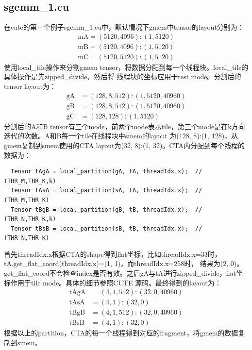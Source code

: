 \documentclass[a4paper,12pt]{ctexart}
\numberwithin{equation}{section}
\begin{document}
\subsection{sgemm\_1.cu}
在cute的第一个例子sgemm\_1.cu中，默认情况下gmem中tensor的layout分别为：
\begin{equation}
  \begin{aligned}
    \mathrm{mA} = (5120,4096):(1,5120) \\
    \mathrm{mB} = (5120,4096):(1,5120) \\
    \mathrm{mC} = (5120,5120):(1,5120)
  \end{aligned}
\end{equation}
使用local\_tile操作来分割gmem tensor，将数据分配到每一个线程块。local\_tile的具体操作是先zipped\_divide，然后将
线程块的坐标应用于rest mode。分割后的tensor layout为：
\begin{equation}
  \begin{aligned}
    \mathrm{gA} & = (128,8,512):(1,5120,40960) \\
    \mathrm{gB} & = (128,8,512):(1,5120,40960) \\
    \mathrm{gC} & = (128,128):(1,5120)
  \end{aligned}
\end{equation}
分割后的A和B tensor有三个mode，前两个mode表示tile，第三个mode是在k方向迭代的次数。A和B每一个tile在线程块中smem的layout
为(128, 8):(1, 128)，从gmem复制到smem使用的CTA layout为(32, 8):(1, 32)。CTA内分配到每个线程的数据为：
\begin{verbatim}
  Tensor tAgA = local_partition(gA, tA, threadIdx.x);  // (THR_M,THR_K,k)
  Tensor tAsA = local_partition(sA, tA, threadIdx.x);  // (THR_M,THR_K)
  Tensor tBgB = local_partition(gB, tB, threadIdx.x);  // (THR_N,THR_K,k)
  Tensor tBsB = local_partition(sB, tB, threadIdx.x);  // (THR_N,THR_K)
\end{verbatim}
首先threadIdx.x根据CTA的shape得到flat坐标，比如threadIdx.x=33时，tA.get_flat_coord(threadIdx.x)=(1, 1)，而threadIdx.x=258时，
结果为(2, 0)。get\_flat\_coord不会检查index是否有效。之后gA与tA进行zipped\_divide，flat坐标作用于tile mode。具体的细节参照CUTE
源码。最终得到的layout为：
\begin{equation}
  \begin{aligned}
    \mathrm{tAgA} & = (4,1,512):(32,0,40960) \\
    \mathrm{tAsA} & = (4,1):(32,0)           \\
    \mathrm{tBgB} & = (4,1,512):(32,0,40960) \\
    \mathrm{tBsB} & = (4,1):(32,0)
  \end{aligned}
\end{equation}
根据以上的partition，CTA的每一个线程得到对应的fragment，将gmem的数据复制到smem。
\end{document}
